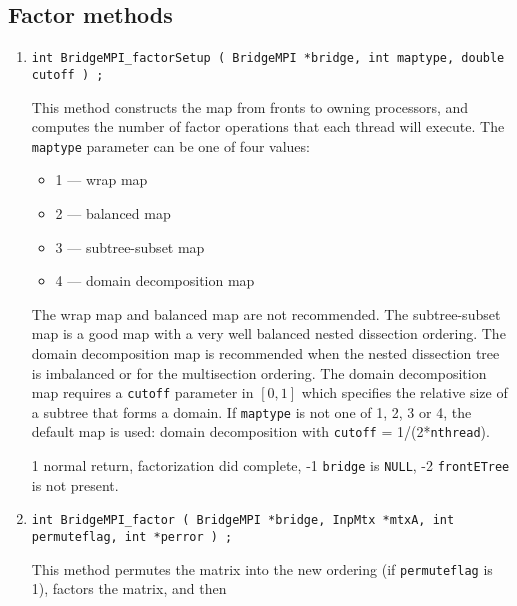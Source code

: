 \subsection{Factor methods}
\label{subsection:BridgeMPI:proto:factor}
\par
\begin{enumerate}
\item
\begin{verbatim}
int BridgeMPI_factorSetup ( BridgeMPI *bridge, int maptype, double cutoff ) ;
\end{verbatim}
This method constructs the map from fronts to owning processors, and
computes the number of factor operations that each thread will execute.
The \texttt{maptype} parameter can be one of four values:
\begin{itemize}
\item 1 --- wrap map
\item 2 --- balanced map
\item 3 --- subtree-subset map
\item 4 --- domain decomposition map
\end{itemize}
The wrap map and balanced map are not recommended.
The subtree-subset map is a good map with a very well balanced
nested dissection ordering.
The domain decomposition map is recommended when the nested
dissection tree is imbalanced or for the multisection ordering.
The domain decomposition map requires a \texttt{cutoff} parameter
in $\left \lbrack0,1\right \rbrack$ 
which specifies the relative size of a subtree that forms a domain.
If \texttt{maptype} is not one of 1, 2, 3 or 4, the default map is
used: domain decomposition with
\texttt{cutoff} = 1/(2*\texttt{nthread}).
\par {}
1 normal return, factorization did complete,
-1 \texttt{bridge} is \texttt{NULL},
-2 \texttt{frontETree} is not present.
\item
\begin{verbatim}
int BridgeMPI_factor ( BridgeMPI *bridge, InpMtx *mtxA, int permuteflag, int *perror ) ;
\end{verbatim}
This method permutes the matrix into the new ordering (if
\texttt{permuteflag} is 1), factors the matrix, and then

\end{enumerate}
